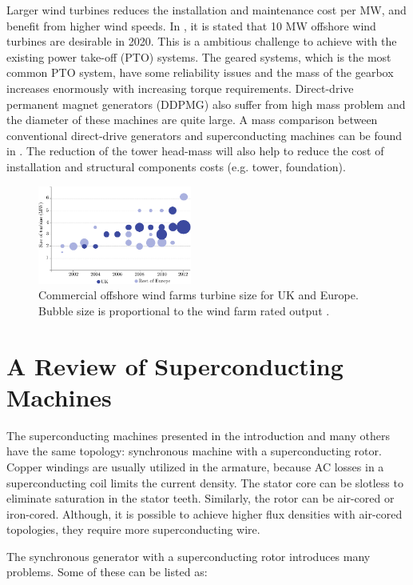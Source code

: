 \documentclass[12pt]{IET02}
\begin{document}
Larger wind turbines reduces the installation and maintenance cost per MW, and benefit from higher wind speeds. In \cite{Abrahamsen2010}, it is stated that 10 MW offshore wind turbines are desirable in 2020. This is a ambitious challenge to achieve with the existing power take-off (PTO) systems. The geared systems, which is the most common PTO system, have some reliability issues and the mass of the gearbox increases enormously with increasing torque requirements. Direct-drive permanent magnet generators (DDPMG) also suffer from high mass problem and the diameter of these machines are quite large. 
A mass comparison between conventional direct-drive generators and superconducting machines can be found in \cite{Keysan2011b}. The reduction of the tower head-mass will also help to reduce the cost of installation and structural components costs (e.g. tower, foundation).

\begin{figure}[]
  \centering
  \includegraphics[width=0.45\textwidth]{offshore-turbine-size}
\caption{Commercial offshore wind farms turbine size for UK and Europe. Bubble size is proportional to the wind farm rated output \cite{bvg}.}
  \label{offshore-turbine-size}
\end{figure}


\section{A Review of Superconducting Machines}

The superconducting machines presented in the introduction and many others have the same topology: synchronous machine with a superconducting rotor. Copper windings are usually utilized in the armature, because AC losses in a superconducting coil limits the current density. The stator core can be slotless to eliminate saturation in the stator teeth. Similarly, the rotor can be air-cored or iron-cored. Although, it is possible to achieve higher flux densities with air-cored topologies, they require more superconducting wire.

The synchronous generator with a superconducting rotor introduces many problems. Some of these can be listed as:
\end{document}
